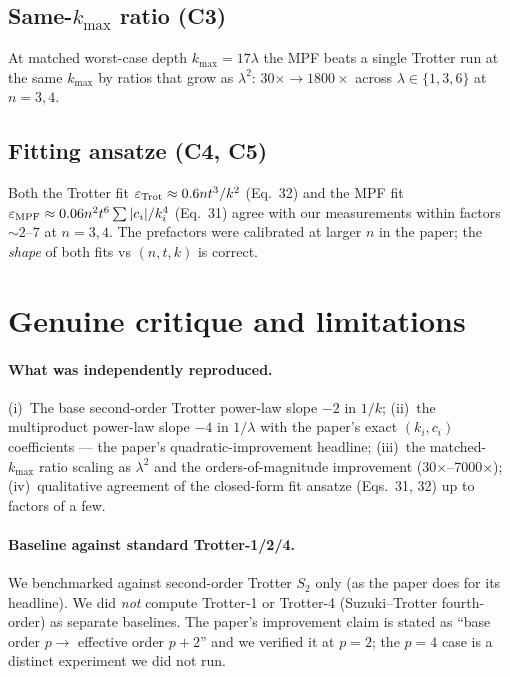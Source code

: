 \documentclass[11pt]{article}
\begin{document}
\subsection{Same-$k_{\max}$ ratio (C3)}
At matched worst-case depth $k_{\max} = 17\lambda$ the MPF beats a single Trotter run at the same
$k_{\max}$ by ratios that grow as $\lambda^2$: $30\times \to 1800\times$ across $\lambda \in \{1,3,6\}$
at $n=3,4$.

\subsection{Fitting ansatze (C4, C5)}
Both the Trotter fit $\varepsilon_{\rm Trot} \approx 0.6 n t^3/k^2$ (Eq.~32) and the MPF fit
$\varepsilon_{\rm MPF} \approx 0.06 n^2 t^6 \sum |c_i|/k_i^4$ (Eq.~31) agree with our measurements
within factors $\sim 2\text{--}7$ at $n=3,4$. The prefactors were calibrated at larger $n$
in the paper; the \emph{shape} of both fits vs $(n,t,k)$ is correct.

\section{Genuine critique and limitations}

\paragraph{What was independently reproduced.}
(i)~The base second-order Trotter power-law slope $-2$ in $1/k$;
(ii)~the multiproduct power-law slope $-4$ in $1/\lambda$ with the paper's exact $(k_i, c_i)$
     coefficients --- the paper's quadratic-improvement headline;
(iii)~the matched-$k_{\max}$ ratio scaling as $\lambda^2$ and the orders-of-magnitude
     improvement (30$\times$--7000$\times$);
(iv)~qualitative agreement of the closed-form fit ansatze (Eqs.~31, 32) up to factors of a few.

\paragraph{Baseline against standard Trotter-1/2/4.}
We benchmarked against second-order Trotter $S_2$ only (as the paper does for its headline).
We did \emph{not} compute Trotter-1 or Trotter-4 (Suzuki--Trotter fourth-order) as separate
baselines. The paper's improvement claim is stated as ``base order $p \to $ effective order
$p{+}2$'' and we verified it at $p=2$; the $p=4$ case is a distinct experiment we did not run.
\end{document}
